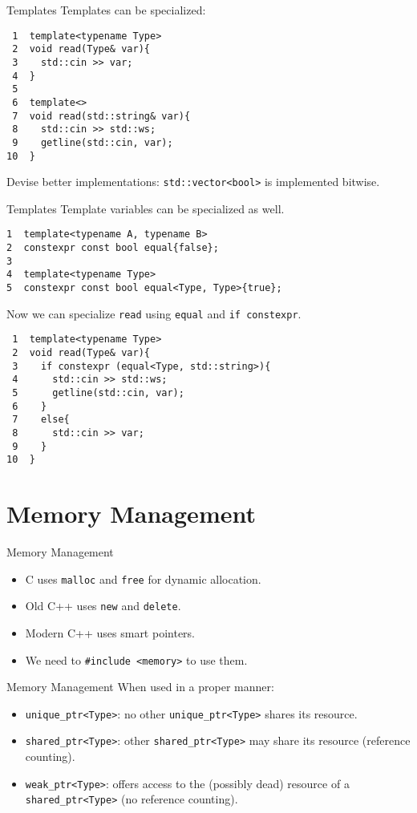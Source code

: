 \documentclass[presentation]{beamer}
\begin{document}
\begin{frame}[label={sec:orgdab6c76},fragile]{Templates}
 Templates can be specialized:
\begin{verbatim}
 1  template<typename Type>
 2  void read(Type& var){
 3    std::cin >> var;
 4  }
 5  
 6  template<>
 7  void read(std::string& var){
 8    std::cin >> std::ws;
 9    getline(std::cin, var);
10  }
\end{verbatim}

Devise better implementations: \texttt{std::vector<bool>} is implemented bitwise.
\end{frame}
\begin{frame}[label={sec:orga953ff2},fragile]{Templates}
 Template variables can be specialized as well.
\begin{verbatim}
1  template<typename A, typename B>
2  constexpr const bool equal{false};
3  
4  template<typename Type>
5  constexpr const bool equal<Type, Type>{true};
\end{verbatim}
Now we can specialize \texttt{read} using \texttt{equal} and \texttt{if constexpr}.
\begin{verbatim}
 1  template<typename Type>
 2  void read(Type& var){
 3    if constexpr (equal<Type, std::string>){
 4      std::cin >> std::ws;
 5      getline(std::cin, var);
 6    }
 7    else{
 8      std::cin >> var;
 9    }
10  }
\end{verbatim}
\end{frame}
\section{Memory Management}
\label{sec:orge5d502a}
\begin{frame}[label={sec:org195e402},fragile]{Memory Management}
 \begin{itemize}
\item C uses \texttt{malloc} and \texttt{free} for dynamic allocation.
\item Old C++ uses \texttt{new} and \texttt{delete}.
\item Modern C++ uses smart pointers.
\item We need to \texttt{\#include <memory>} to use them.
\end{itemize}
\end{frame}

\begin{frame}[label={sec:org2570950},fragile]{Memory Management}
 When used in a proper manner:
\begin{itemize}
\item \texttt{unique\_ptr<Type>}: no other \texttt{unique\_ptr<Type>} shares its
resource.
\item \texttt{shared\_ptr<Type>}: other \texttt{shared\_ptr<Type>} may share its
resource (reference counting).
\item \texttt{weak\_ptr<Type>}: offers access to the (possibly dead) resource of
a \texttt{shared\_ptr<Type>} (no reference counting).
\end{itemize}
\end{frame}
\end{document}
